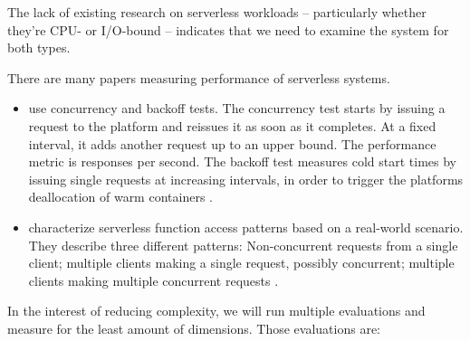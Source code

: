 

The lack of existing research on serverless workloads -- particularly whether they're CPU- or I/O-bound -- indicates that we need to examine the system for both types.

There are many papers measuring performance of serverless systems.

\begin{itemize}
    \item \citeauthor{McGrath2017} use concurrency and backoff tests. The concurrency test starts by issuing a request to the platform and reissues it as soon as it completes. At a fixed interval, it adds another request up to an upper bound. The performance metric is responses per second. The backoff test measures cold start times by issuing single requests at increasing intervals, in order to trigger the platforms deallocation of warm containers \cite{McGrath2017}.
    \item \citeauthor{Hall2019} characterize serverless function access patterns based on a real-world scenario. They describe three different patterns: Non-concurrent requests from a single client; multiple clients making a single request, possibly concurrent; multiple clients making multiple concurrent requests \cite{Hall2019}.
\end{itemize}

In the interest of reducing complexity, we will run multiple evaluations and measure for the least amount of dimensions. Those evaluations are:

